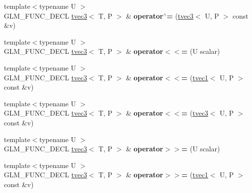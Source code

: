 \begin{DoxyCompactItemize}
\item 
\hypertarget{structglm_1_1tvec3_a31247f55bc34542e94c0928ad1c1e5e5}{{\footnotesize template$<$typename U $>$ }\\G\-L\-M\-\_\-\-F\-U\-N\-C\-\_\-\-D\-E\-C\-L \hyperlink{structglm_1_1tvec3}{tvec3}$<$ T, P $>$ \& {\bfseries operator$^\wedge$=} (\hyperlink{structglm_1_1tvec3}{tvec3}$<$ U, P $>$ const \&v)}\label{structglm_1_1tvec3_a31247f55bc34542e94c0928ad1c1e5e5}

\item 
\hypertarget{structglm_1_1tvec3_abadcfbf4495179ac2e32d2f986d7bbb6}{{\footnotesize template$<$typename U $>$ }\\G\-L\-M\-\_\-\-F\-U\-N\-C\-\_\-\-D\-E\-C\-L \hyperlink{structglm_1_1tvec3}{tvec3}$<$ T, P $>$ \& {\bfseries operator$<$$<$=} (U scalar)}\label{structglm_1_1tvec3_abadcfbf4495179ac2e32d2f986d7bbb6}

\item 
\hypertarget{structglm_1_1tvec3_af0d715a07138f9619ac7ee1924fa8940}{{\footnotesize template$<$typename U $>$ }\\G\-L\-M\-\_\-\-F\-U\-N\-C\-\_\-\-D\-E\-C\-L \hyperlink{structglm_1_1tvec3}{tvec3}$<$ T, P $>$ \& {\bfseries operator$<$$<$=} (\hyperlink{structglm_1_1tvec1}{tvec1}$<$ U, P $>$ const \&v)}\label{structglm_1_1tvec3_af0d715a07138f9619ac7ee1924fa8940}

\item 
\hypertarget{structglm_1_1tvec3_af05b4498d260dd9d784292b6a7873a80}{{\footnotesize template$<$typename U $>$ }\\G\-L\-M\-\_\-\-F\-U\-N\-C\-\_\-\-D\-E\-C\-L \hyperlink{structglm_1_1tvec3}{tvec3}$<$ T, P $>$ \& {\bfseries operator$<$$<$=} (\hyperlink{structglm_1_1tvec3}{tvec3}$<$ U, P $>$ const \&v)}\label{structglm_1_1tvec3_af05b4498d260dd9d784292b6a7873a80}

\item 
\hypertarget{structglm_1_1tvec3_aa4fd6ddbdc563f18f8f172c27ee83e11}{{\footnotesize template$<$typename U $>$ }\\G\-L\-M\-\_\-\-F\-U\-N\-C\-\_\-\-D\-E\-C\-L \hyperlink{structglm_1_1tvec3}{tvec3}$<$ T, P $>$ \& {\bfseries operator$>$$>$=} (U scalar)}\label{structglm_1_1tvec3_aa4fd6ddbdc563f18f8f172c27ee83e11}

\item 
\hypertarget{structglm_1_1tvec3_a7cb73c7e9a6756532e450515bc7f67ec}{{\footnotesize template$<$typename U $>$ }\\G\-L\-M\-\_\-\-F\-U\-N\-C\-\_\-\-D\-E\-C\-L \hyperlink{structglm_1_1tvec3}{tvec3}$<$ T, P $>$ \& {\bfseries operator$>$$>$=} (\hyperlink{structglm_1_1tvec1}{tvec1}$<$ U, P $>$ const \&v)}\label{structglm_1_1tvec3_a7cb73c7e9a6756532e450515bc7f67ec}


\end{DoxyCompactItemize}
